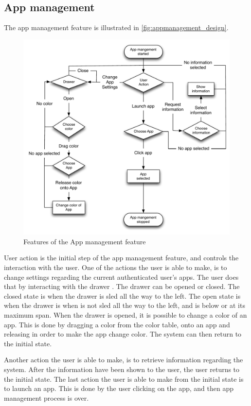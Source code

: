 \subsection{App management}
\label{design:app_manangement}
The app management feature is illustrated in \autoref{fig:appmanagement_design}. 
\begin{figure}[h]
	\centering
	\includegraphics[width=1\textwidth]{gfx/appmanagement.pdf}
	\caption{Features of the App management feature}
	\label{fig:appmanagement_design}
\end{figure}
User action is the initial step of the app management feature, and controls the interaction with the user.
One of the actions the user is able to make, is to change settings regarding the current authenticated user's apps.
The user does that by interacting with the drawer .
The drawer can be opened or closed.
The closed state is when the drawer is sled all the way to the left.
The open state is when the drawer is when is not sled all the way to the left, and is below or at its maximum span.
When the drawer is opened, it is possible to change a color of an app.
This is done by dragging a color from the color table, onto an app and releasing in order to make the app change color.
The system can then return to the initial state.

Another action the user is able to make, is to retrieve information regarding the system.
After the information have been shown to the user, the user returns to the initial state.
The last action the user is able to make from the initial state is to launch an app.
This is done by the user clicking on the app, and then app management process is over.

